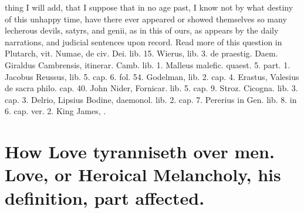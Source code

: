 thing I will add, that I suppose that in no age past, I know not by
what destiny of this unhappy time, have there ever appeared or showed
themselves so many lecherous devils, satyrs, and genii, as in this of
ours, as appears by the daily narrations, and judicial sentences upon
record. Read more of this question in Plutarch, vit. Numae, \Austin{} de
civ. Dei. lib. 15. Wierus, lib. 3. de praestig. Daem. Giraldus
Cambrensis, itinerar. Camb. lib. 1. Malleus malefic. quaest. 5. part.
1. Jacobus Reussus, lib. 5. cap. 6. fol. 54. Godelman, lib. 2. cap. 4.
Erastus, Valesius de sacra philo. cap. 40. John Nider, Fornicar. lib.
5. cap. 9. Stroz. Cicogna. lib. 3. cap. 3. Delrio, Lipsius Bodine,
daemonol. lib. 2. cap. 7. Pererius in Gen. lib. 8. in 6. cap. ver. 2.
King James, \etc{}.

\section[How Love tyranniseth over men.]{How Love tyranniseth over men. Love, or Heroical Melancholy, his definition, part affected.}

